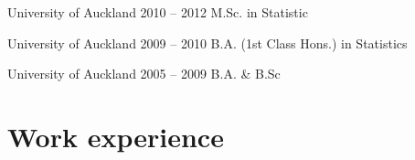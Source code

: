 \documentclass{tccv}
\begin{document}
\begin{yearlist}

\item[University of Auckland]{2010 -- 2012}
     {M.Sc. in Statistic}
{}

\item[University of Auckland]{2009 -- 2010}
     {B.A. (1st Class Hons.) \newline in Statistics}
{}

\item[University of Auckland]{2005 -- 2009}
  {B.A. \& B.Sc}
  {}





\end{yearlist}

\vspace{1cm}

\section{Work experience}
\end{document}

